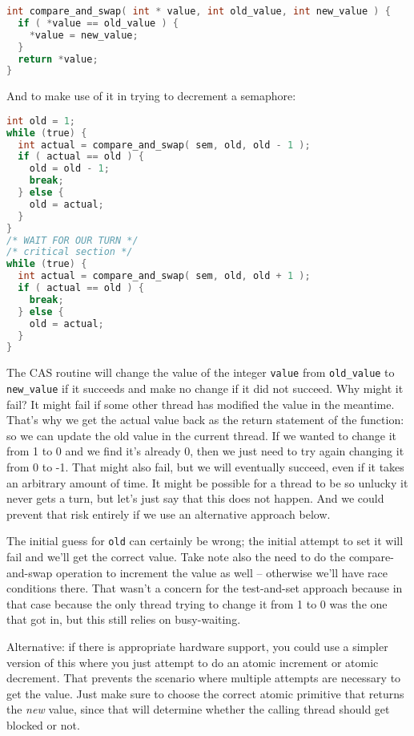 \begin{lstlisting}[language=C]
int compare_and_swap( int * value, int old_value, int new_value ) {
  if ( *value == old_value ) {
    *value = new_value;
  }
  return *value;
}
\end{lstlisting}

And to make use of it in trying to decrement a semaphore:

\begin{lstlisting}[language=C]
int old = 1;
while (true) {
  int actual = compare_and_swap( sem, old, old - 1 );
  if ( actual == old ) {
    old = old - 1;
    break;
  } else {
    old = actual;
  }
}
/* WAIT FOR OUR TURN */
/* critical section */
while (true) {
  int actual = compare_and_swap( sem, old, old + 1 );
  if ( actual == old ) {
    break;
  } else {
    old = actual;
  }
}
\end{lstlisting}

The CAS routine will change the value of the integer \texttt{value} from \texttt{old\_value} to \texttt{new\_value} if it succeeds and make no change if it did not succeed. Why might it fail? It might fail if some other thread has modified the value in the meantime. That's why we get the actual value back as the return statement of the function: so we can update the old value in the current thread. If we wanted to change it from 1 to 0 and we find it's already 0, then we just need to try again changing it from 0 to -1. That might also fail, but we will eventually succeed, even if it takes an arbitrary amount of time. It might be possible for a thread to be so unlucky it never gets a turn, but let's just say that this does not happen. And we could prevent that risk entirely if we use an alternative approach below.

The initial guess for \texttt{old} can certainly be wrong; the initial attempt to set it will fail and we'll get the correct value. Take note also the need to do the compare-and-swap operation to increment the value as well -- otherwise we'll have race conditions there. That wasn't a concern for the test-and-set approach because in that case because the only thread trying to change it from 1 to 0 was the one that got in, but this still relies on busy-waiting.

Alternative: if there is appropriate hardware support, you could use a simpler version of this where you just attempt to do an atomic increment or atomic decrement. That prevents the scenario where multiple attempts are necessary to get the value. Just make sure to choose the correct atomic primitive that returns the \textit{new} value, since that will determine whether the calling thread should get blocked or not. 

